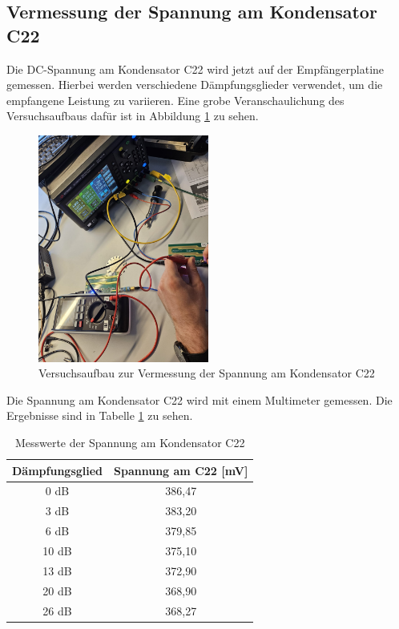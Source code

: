 \subsection{Vermessung der Spannung am Kondensator C22}
Die DC-Spannung am Kondensator C22 wird jetzt auf der Empfängerplatine gemessen. Hierbei werden verschiedene Dämpfungsglieder verwendet, um die empfangene Leistung zu variieren. Eine grobe Veranschaulichung des Versuchsaufbaus dafür ist in Abbildung \ref{fig:versuchsaufbau2} zu sehen.
\begin{figure}[H]
    \centering
    \includegraphics[width=0.5\textwidth]{Pictures/VesuchsaufbauSpannung.jpg}
    \caption{Versuchsaufbau zur Vermessung der Spannung am Kondensator C22}
    \label{fig:versuchsaufbau2}
\end{figure}
Die Spannung am Kondensator C22 wird mit einem Multimeter gemessen. Die Ergebnisse sind in Tabelle \ref{tab:spannung} zu sehen.
\begin{table}[H]
    \centering
    \caption{Messwerte der Spannung am Kondensator C22}
    \begin{tabular}{|c|c|}
        \hline
        Dämpfungsglied & Spannung am C22 [mV] \\ \hline
        0 dB            & 386,47                 \\ \hline
        3 dB            & 383,20                 \\ \hline
        6 dB            & 379,85                 \\ \hline
        10 dB           & 375,10                 \\ \hline
        13 dB           & 372,90                 \\ \hline
        20 dB           & 368,90                 \\ \hline
        26 dB           & 368,27                 \\ \hline
    \end{tabular}
    \label{tab:spannung}
\end{table}

